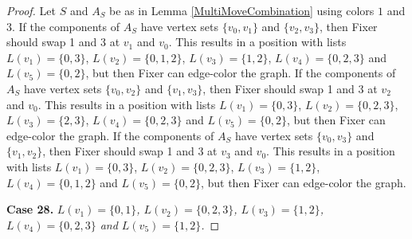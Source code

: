 \documentclass[12pt]{amsart}
\theoremstyle{plain}
\theoremstyle{definition}
\theoremstyle{remark}
\begin{document}
\begin{proof}
Let $S$ and $A_S$ be as in Lemma \ref{MultiMoveCombination} using colors $1$ and $3$. If the components of $A_S$ have vertex sets $\{v_0, v_1\}$ and $\{v_2, v_3\}$, then Fixer should swap 1 and 3 at $v_1$ and $v_0$. This results in a position with lists $L(v_1) = \{0, 3\}$, $L(v_2) = \{0, 1, 2\}$, $L(v_3) = \{1, 2\}$, $L(v_4) = \{0, 2, 3\}$ and $L(v_5) = \{0, 2\}$, but then Fixer can edge-color the graph.
If the components of $A_S$ have vertex sets $\{v_0, v_2\}$ and $\{v_1, v_3\}$, then Fixer should swap 1 and 3 at $v_2$ and $v_0$. This results in a position with lists $L(v_1) = \{0, 3\}$, $L(v_2) = \{0, 2, 3\}$, $L(v_3) = \{2, 3\}$, $L(v_4) = \{0, 2, 3\}$ and $L(v_5) = \{0, 2\}$, but then Fixer can edge-color the graph.
If the components of $A_S$ have vertex sets $\{v_0, v_3\}$ and $\{v_1, v_2\}$, then Fixer should swap 1 and 3 at $v_3$ and $v_0$. This results in a position with lists $L(v_1) = \{0, 3\}$, $L(v_2) = \{0, 2, 3\}$, $L(v_3) = \{1, 2\}$, $L(v_4) = \{0, 1, 2\}$ and $L(v_5) = \{0, 2\}$, but then Fixer can edge-color the graph.

\noindent\textbf{Case 28.  }\textit{$L(v_1) = \{0, 1\}$, $L(v_2) = \{0, 2, 3\}$, $L(v_3) = \{1, 2\}$, $L(v_4) = \{0, 2, 3\}$ and $L(v_5) = \{1, 2\}$.}


\end{proof}
\end{document}
